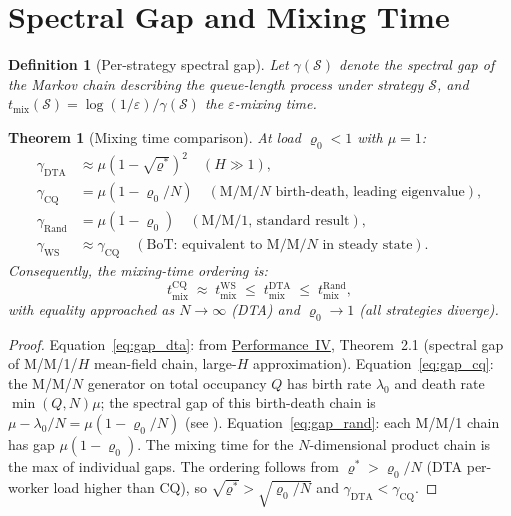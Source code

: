 \documentclass[11pt,a4paper]{article}
\newtheorem{theorem}{Theorem}[section]
\newtheorem{definition}{Definition}[section]
\begin{document}
\section{Spectral Gap and Mixing Time}

\begin{definition}[Per-strategy spectral gap]
Let $\gamma(\mathcal{S})$ denote the spectral gap of the Markov chain
describing the queue-length process under strategy $\mathcal{S}$,
and $t_{\mathrm{mix}}(\mathcal{S}) = \log(1/\varepsilon)/\gamma(\mathcal{S})$
the $\varepsilon$-mixing time.
\end{definition}

\begin{theorem}[Mixing time comparison]\label{thm:mixing_compare}
At load $\varrho_0 < 1$ with $\mu = 1$:
\begin{align}
  \gamma_{\mathrm{DTA}} &\approx \mu(1 - \sqrt{\varrho^*})^2
     \quad(H \gg 1), \label{eq:gap_dta}\\
  \gamma_{\mathrm{CQ}} &= \mu(1 - \varrho_0/N)
     \quad(\text{M/M/}N \text{ birth-death, leading eigenvalue}), \label{eq:gap_cq}\\
  \gamma_{\mathrm{Rand}} &= \mu(1 - \varrho_0)
     \quad(\text{M/M/1, standard result}), \label{eq:gap_rand}\\
  \gamma_{\mathrm{WS}} &\approx \gamma_{\mathrm{CQ}}
     \quad(\text{BoT: equivalent to M/M/}N \text{ in steady state}). \label{eq:gap_ws}
\end{align}
Consequently, the mixing-time ordering is:
\[
  t_{\mathrm{mix}}^{\mathrm{CQ}} \;\approx\; t_{\mathrm{mix}}^{\mathrm{WS}}
  \;\le\; t_{\mathrm{mix}}^{\mathrm{DTA}}
  \;\le\; t_{\mathrm{mix}}^{\mathrm{Rand}},
\]
with equality approached as $N \to \infty$ (DTA) and $\varrho_0 \to 1$ (all strategies diverge).
\end{theorem}

\begin{proof}
Equation~\eqref{eq:gap_dta}: from \hyperref[chap:stability]{Performance~IV}, Theorem~2.1 (spectral
gap of M/M/1/$H$ mean-field chain, large-$H$ approximation).
Equation~\eqref{eq:gap_cq}: the M/M/$N$ generator on total occupancy $Q$
has birth rate $\lambda_0$ and death rate $\min(Q,N)\mu$; the spectral gap
of this birth-death chain is $\mu - \lambda_0/N = \mu(1-\varrho_0/N)$
(see \cite{fill1991}).
Equation~\eqref{eq:gap_rand}: each M/M/1 chain has gap $\mu(1-\varrho_0)$.
The mixing time for the $N$-dimensional product chain is the max of individual gaps.
The ordering follows from $\varrho^* > \varrho_0/N$ (DTA per-worker load higher
than CQ), so $\sqrt{\varrho^*} > \sqrt{\varrho_0/N}$ and $\gamma_{\mathrm{DTA}} < \gamma_{\mathrm{CQ}}$.
\end{proof}
\end{document}
